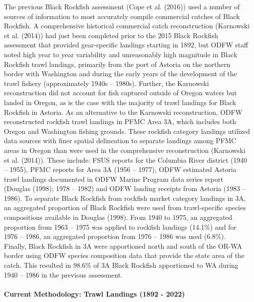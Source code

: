\documentclass[11pt,
  english,
  letterpaper,
]{article}
\begin{document}
The previous Black Rockfish assessment (Cope et al. (2016)) used a number of sources of information to most accurately compile commercial catches of Black Rockfish. A comprehensive historical commercial catch reconstruction (Karnowski et al. (2014)) had just been completed prior to the 2015 Black Rockfish assessment that provided gear-specific landings starting in 1892, but ODFW staff noted high year to year variability and unreasonably high magnitude in Black Rockfish trawl landings, primarily from the port of Astoria on the northern border with Washington and during the early years of the development of the trawl fishery (approximately 1940s -- 1980s). Further, the Karnowski reconstruction did not account for fish captured outside of Oregon waters but landed in Oregon, as is the case with the majority of trawl landings for Black Rockfish in Astoria. As an alternative to the Karnowski reconstruction, ODFW reconstructed rockfish trawl landings in PFMC Area 3A, which includes both Oregon and Washington fishing grounds. These rockfish category landings utilized data sources with finer spatial delineation to separate landings among PFMC areas in Oregon than were used in the comprehensive reconstruction (Karnowski et al. (2014)). These include: FSUS reports for the Columbia River district (1940 -- 1955), PFMC reports for Area 3A (1956 -- 1977), ODFW estimated Astoria trawl landings documented in ODFW Marine Program data series report (Douglas (1998); 1978 -- 1982) and ODFW landing receipts from Astoria (1983 -- 1986). To separate Black Rockfish from rockfish market category landings in 3A, an aggregated proportion of Black Rockfish were used from trawl-specific species compositions available in Douglas (1998). From 1940 to 1975, an aggregated proportion from 1963 -- 1975 was applied to rockfish landings (14.1\%) and for 1976 -- 1986, an aggregated proportion from 1976 -- 1986 was used (6.8\%). Finally, Black Rockfish in 3A were apportioned north and south of the OR-WA border using ODFW species composition data that provide the state area of the catch. This resulted in 98.6\% of 3A Black Rockfish apportioned to WA during 1940 -- 1986 in the previous assessment.

\hypertarget{current-methodology-trawl-landings-1892---2022}{%
\paragraph{Current Methodology: Trawl Landings (1892 - 2022)}\label{current-methodology-trawl-landings-1892---2022}}
\end{document}
